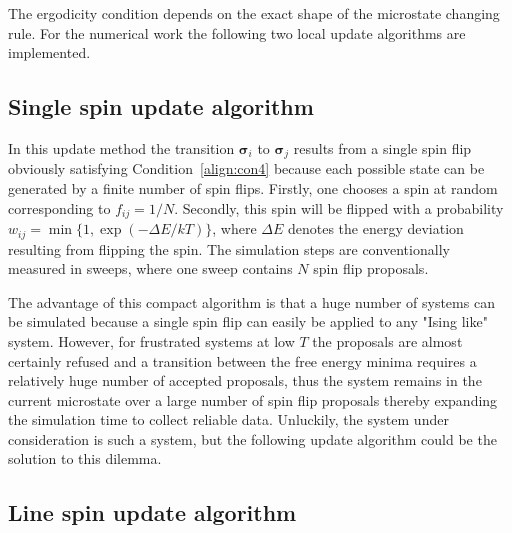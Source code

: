 The ergodicity condition depends on the exact shape of the microstate changing rule. For the numerical work the following two local update algorithms 
are implemented. 



\subsection*{Single spin update algorithm}

In this update method the transition $\bm{\sigma}_i$ to $\bm{\sigma}_j$ results from a single spin flip obviously satisfying Condition~\eqref{align:con4} 
because each possible state can be generated by a finite number of spin flips. Firstly, one chooses a spin at random corresponding
to $f_{ij}=1/N$. Secondly, this spin will be flipped with a probability $w_{ij}=\min\{1,\exp(-\Delta E/kT)\}$, where $\Delta E$ denotes the
energy deviation resulting from flipping the spin. The simulation steps are conventionally measured in sweeps, where one sweep contains $N$ spin flip 
proposals.

The advantage of this compact algorithm is that a huge number of systems can be simulated because a single spin flip can easily be applied to any "Ising like" 
system. However, for frustrated systems at low $T$ the proposals are almost certainly refused and a transition between the free energy minima requires 
a relatively huge number of accepted proposals, thus the system remains in the 
current microstate over a large number of spin flip proposals thereby expanding the simulation time to collect reliable data. Unluckily, the system under consideration 
is such a system, but the following update algorithm could be the solution to this dilemma. 



\subsection*{Line spin update algorithm}

